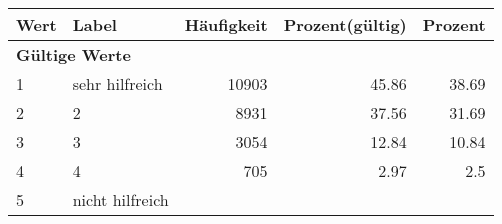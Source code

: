      \begin{longtable}{lXrrr}
     \toprule
     \textbf{Wert} & \textbf{Label} & \textbf{Häufigkeit} & \textbf{Prozent(gültig)} & \textbf{Prozent} \\
     \endhead
     \midrule
     \multicolumn{5}{l}{\textbf{Gültige Werte}}\\

     1 &
     \multicolumn{1}{X}{ sehr hilfreich   } &


       \num{10903} &
       \num[round-mode=places,round-precision=2]{45,86} &
         \num[round-mode=places,round-precision=2]{38,69} \\

     2 &
     \multicolumn{1}{X}{ 2   } &


       \num{8931} &
       \num[round-mode=places,round-precision=2]{37,56} &
         \num[round-mode=places,round-precision=2]{31,69} \\

     3 &
     \multicolumn{1}{X}{ 3   } &


       \num{3054} &
       \num[round-mode=places,round-precision=2]{12,84} &
         \num[round-mode=places,round-precision=2]{10,84} \\

     4 &
     \multicolumn{1}{X}{ 4   } &


       \num{705} &
       \num[round-mode=places,round-precision=2]{2,97} &
         \num[round-mode=places,round-precision=2]{2,5} \\

     5 &
     \multicolumn{1}{X}{ nicht hilfreich   } &



\end{longtable}

